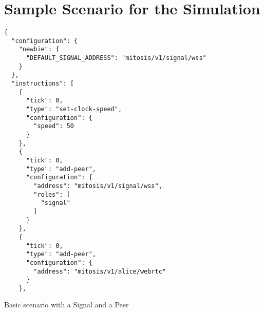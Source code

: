 \section{Sample Scenario for the Simulation}
\label{sec:visualisation-tabs}
\begin{Listing}[htb!]
\begin{lstlisting}
{
  "configuration": {
    "newbie": {
      "DEFAULT_SIGNAL_ADDRESS": "mitosis/v1/signal/wss"
    }
  },
  "instructions": [
    {
      "tick": 0,
      "type": "set-clock-speed",
      "configuration": {
        "speed": 50
      }
    },
    {
      "tick": 0,
      "type": "add-peer",
      "configuration": {
        "address": "mitosis/v1/signal/wss",
        "roles": [
          "signal"
        ]
      }
    },
    {
      "tick": 0,
      "type": "add-peer",
      "configuration": {
        "address": "mitosis/v1/alice/webrtc"
      }
    },
\end{lstlisting}
\caption{Basic scenario with a Signal and a Peer}
\label{lst:anl-scenario}
\end{Listing}